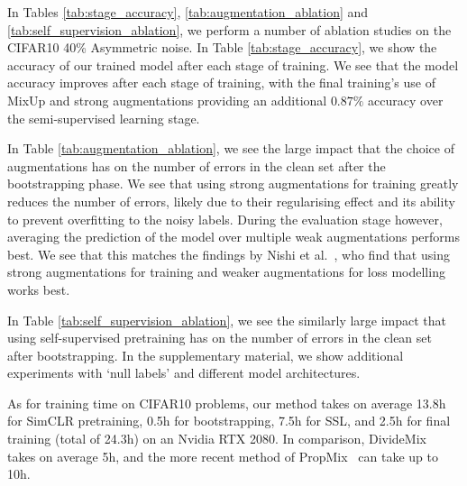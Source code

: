 \documentclass[10pt,twocolumn,letterpaper]{article}
\begin{document}
In Tables \ref{tab:stage_accuracy}, \ref{tab:augmentation_ablation} and \ref{tab:self_supervision_ablation}, we perform a number of ablation studies on the CIFAR10 40\% Asymmetric noise. 
In Table \ref{tab:stage_accuracy}, we show the accuracy of our trained model after each stage of training. We see that the model accuracy improves after each stage of training, with the final training's use of MixUp and strong augmentations providing an additional $0.87\%$ accuracy over the semi-supervised learning stage.

In Table \ref{tab:augmentation_ablation}, we see the large impact that the choice of augmentations has on the number of errors in the clean set after the bootstrapping phase. We see that using strong augmentations for training greatly reduces the number of errors, likely due to their regularising effect and its ability to prevent overfitting to the noisy labels. During the evaluation stage however, averaging the prediction of the model over multiple weak augmentations performs best. We see that this matches the findings by Nishi et al.~\cite{Nishi_2021_CVPR}, who find that using strong augmentations for training and weaker augmentations for loss modelling works best.

In Table \ref{tab:self_supervision_ablation}, we see the similarly large impact that using self-supervised pretraining has on the number of errors in the clean set after bootstrapping. In the supplementary material, we show additional experiments with `null labels' and different model architectures.

As for training time on CIFAR10 problems, our method takes on average 13.8h for SimCLR pretraining, 0.5h for bootstrapping, 7.5h for SSL, and 2.5h for final training (total of 24.3h) on an Nvidia RTX 2080. In comparison, DivideMix~\cite{li2020dividemix} takes on average 5h, and the more recent method of PropMix~\cite{cordeiro2021propmix} can take up to 10h.

\begin{table}[t!]
    \begin{center}
    \end{center}
    \caption{Model accuracy after each stage of training on CIFAR10 Asym. 40\% noise.}
    \label{tab:stage_accuracy}
\end{table}
\end{document}
